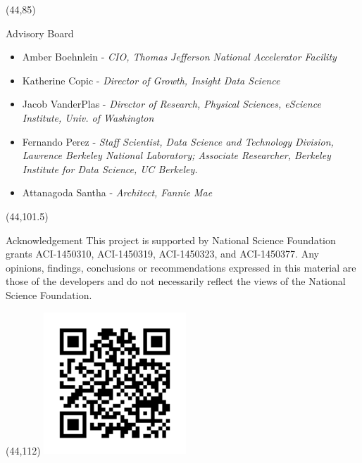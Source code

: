 \documentclass[final]{beamer}
\begin{document}
\begin{frame}{}
\begin{textblock}{38.0}(44,85)
\begin{block}{Advisory Board}
\begin{itemize}
\item Amber Boehnlein - {\it CIO, Thomas Jefferson National Accelerator Facility}
\item Katherine Copic - {\it Director of Growth, Insight Data Science}
\item Jacob VanderPlas - {\it Director of Research, Physical Sciences, eScience Institute, Univ. of Washington}
\item Fernando Perez - {\it Staff Scientist, Data Science and Technology Division, Lawrence Berkeley National Laboratory; Associate Researcher, Berkeley Institute for Data Science, UC Berkeley.}
\item Attanagoda Santha - {\it Architect, Fannie Mae}
\end{itemize}
\end{block}
\end{textblock}



\begin{textblock}{38.0}(44,101.5)
\begin{block}{Acknowledgement}
This project is supported by National Science Foundation grants ACI-1450310, ACI-1450319, ACI-1450323, and ACI-1450377. Any opinions, findings, conclusions or recommendations expressed in this material are those of the developers and do not necessarily reflect the views of the National Science Foundation.
\end{block}
\end{textblock}



\begin{textblock}{10.0}(44,112)
\includegraphics[width=0.4\textwidth]{images/si2-2017-poster-qr.png}
\end{textblock}


\end{frame}
\end{document}
